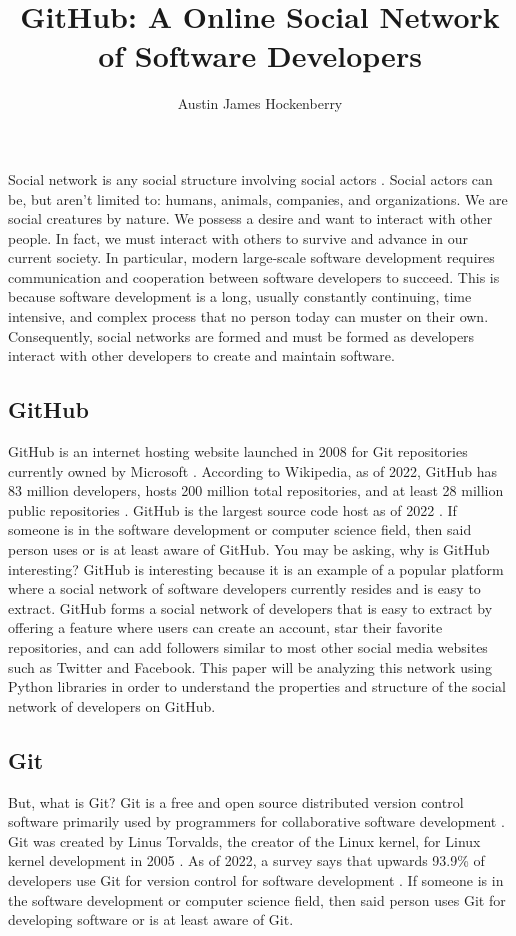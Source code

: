 \documentclass[9pt,twocolumn,twoside]{pnas-new}
\title{GitHub: A Online Social Network of Software Developers}
\author[a,1]{Austin James Hockenberry}
\affil[a]{Undergraduate Student at the State University of New York at Buffalo}
\begin{document}
\maketitle
\thispagestyle{firststyle}

 Social network is any social structure involving social actors \cite{wikipediasocialnetwork}. Social actors can be, but aren't limited to: humans, animals, companies, and organizations. We are social creatures by nature. We possess a desire and want to interact with other people. In fact, we must interact with others to survive and advance in our current society. In particular, modern large-scale software development requires communication and cooperation between software developers to succeed. This is because software development is a long, usually constantly continuing, time intensive, and complex process that no person today can muster on their own. Consequently, social networks are formed and must be formed as developers interact with other developers to create and maintain software.

\subsection{GitHub} GitHub is an internet hosting website launched in 2008 for Git repositories currently owned by Microsoft \cite{wikipediagithub}. According to Wikipedia, as of 2022, GitHub has 83 million developers, hosts 200 million total repositories, and at least 28 million public repositories \cite{wikipediagithub}. GitHub is the largest source code host as of 2022 \cite{wikipediagithub}. If someone is in the software development or computer science field, then said person uses or is at least aware of GitHub. You may be asking, why is GitHub interesting? GitHub is interesting because it is an example of a popular platform where a social network of software developers currently resides and is easy to extract. GitHub forms a social network of developers that is easy to extract by offering a feature where users can create an account, star their favorite repositories, and can add followers similar to most other social media websites such as Twitter and Facebook. This paper will be analyzing this network using Python libraries in order to understand the properties and structure of the social network of developers on GitHub.

\subsection{Git} But, what is Git? Git is a free and open source distributed version control software primarily used by programmers for collaborative software development \cite{wikipediagit}. Git was created by Linus Torvalds, the creator of the Linux kernel, for Linux kernel development in 2005 \cite{wikipediagit}. As of 2022, a survey says that upwards 93.9\% of developers use Git for version control for software development \cite{wikipediagit}. If someone is in the software development or computer science field, then said person uses Git for developing software or is at least aware of Git.
\end{document}
